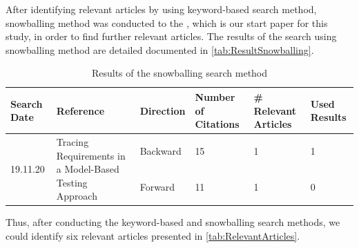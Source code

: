 After identifying relevant articles by using keyword-based search method, snowballing method was conducted to the \cite{Paper1}, which is our start paper for this study, in order to find further relevant articles. The results of the search using snowballing method are detailed documented in \autoref{tab:ResultSnowballing}.

\begin{table} [H] 
\begin{small}
\begin{center}
\begin{scriptsize}
\caption{Results of the snowballing search method}
\label{tab:ResultSnowballing}
\begin{tabular}{  m{1.2cm} | m{4.7cm} | m{1.3cm} | m{1.6cm} | m{1.7cm} | m{1.2cm} }
\hline
\textbf{Search Date} & \textbf{Reference} & \textbf{Direction}  & \textbf{Number of Citations}  &  \textbf{\# Relevant Articles}  &  \textbf{Used Results} \\
\hline
\multirow{2}{1.2cm}{19.11.20} &  \multirow{2}{4.7cm}{\cite{Paper1} Tracing Requirements in a Model-Based Testing Approach} & Backward & 15 &  1 &1  \\ \cline{3-6} & & Forward &11 &1 & 0\\ 
\hline
\end{tabular}
\end{scriptsize}
 \end{center}
	\end{small}
\end{table}

Thus, after conducting the keyword-based and snowballing search methods, we could identify six relevant articles presented in \autoref{tab:RelevantArticles}.

